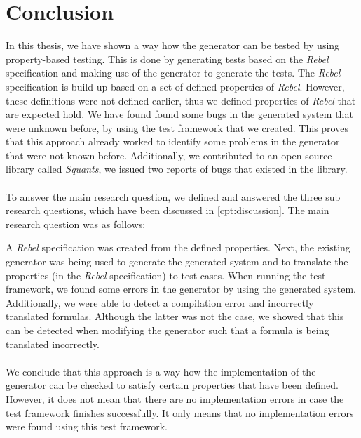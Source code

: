\chapter{Conclusion}
\label{chp:conclusion}
In this thesis, we have shown a way how the generator can be tested by using property-based testing. This is done by generating tests based on the \textit{Rebel} specification and making use of the generator to generate the tests. The \textit{Rebel} specification is build up based on a set of defined properties of \textit{Rebel}. However, these definitions were not defined earlier, thus we defined properties of \textit{Rebel} that are expected hold. We have found found some bugs in the generated system that were unknown before, by using the test framework that we created. This proves that this approach already worked to identify some problems in the generator that were not known before. Additionally, we contributed to an open-source library called \textit{Squants}, we issued two reports of bugs that existed in the library.\\
\\
To answer the main research question, we defined and answered the three sub research questions, which have been discussed in \autoref{cpt:discussion}. The main research question was as follows:
\begin{quote}
\rqMain
\end{quote}
A \textit{Rebel} specification was created from the defined properties. Next, the existing generator was being used to generate the generated system and to translate the properties (in the \textit{Rebel} specification) to test cases. When running the test framework, we found some errors in the generator by using the generated system. Additionally, we were able to detect a compilation error and incorrectly translated formulas. Although the latter was not the case, we showed that this can be detected when modifying the generator such that a formula is being translated incorrectly.\\
\\
We conclude that this approach is a way how the implementation of the generator can be checked to satisfy certain properties that have been defined. However, it does not mean that there are no implementation errors in case the test framework finishes successfully. It only means that no implementation errors were found using this test framework.

